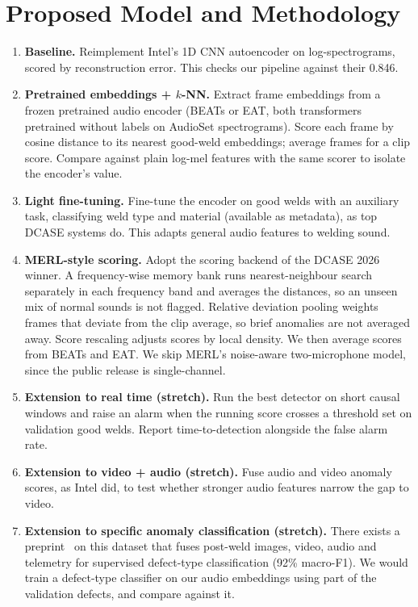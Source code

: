 \documentclass[11pt]{article}
\begin{document}
\section{Proposed Model and Methodology}

\begin{enumerate}
    \item \textbf{Baseline.} Reimplement Intel's 1D CNN autoencoder on log-spectrograms, scored by reconstruction error. This checks our pipeline against their 0.846.
    \item \textbf{Pretrained embeddings + $k$-NN.} Extract frame embeddings from a frozen pretrained audio encoder (BEATs or EAT, both transformers pretrained without labels on AudioSet spectrograms). Score each frame by cosine distance to its nearest good-weld embeddings; average frames for a clip score. Compare against plain log-mel features with the same scorer to isolate the encoder's value.
    \item \textbf{Light fine-tuning.} Fine-tune the encoder on good welds with an auxiliary task, classifying weld type and material (available as metadata), as top DCASE systems do. This adapts general audio features to welding sound.
    \item \textbf{MERL-style scoring.} Adopt the scoring backend of the DCASE 2026 winner. A frequency-wise memory bank runs nearest-neighbour search separately in each frequency band and averages the distances, so an unseen mix of normal sounds is not flagged. Relative deviation pooling weights frames that deviate from the clip average, so brief anomalies are not averaged away. Score rescaling adjusts scores by local density. We then average scores from BEATs and EAT. We skip MERL's noise-aware two-microphone model, since the public release is single-channel.
    \item \textbf{Extension to real time (stretch).} Run the best detector on short causal windows and raise an alarm when the running score crosses a threshold set on validation good welds. Report time-to-detection alongside the false alarm rate.
    \item \textbf{Extension to video + audio (stretch).} Fuse audio and video anomaly scores, as Intel did, to test whether stronger audio features narrow the gap to video.
    \item \textbf{Extension to specific anomaly classification (stretch).} There exists a preprint~\cite{supervisedpreprint} on this dataset that fuses post-weld images, video, audio and telemetry for supervised defect-type classification (92\% macro-F1). We would train a defect-type classifier on our audio embeddings using part of the validation defects, and compare against it.
\end{enumerate}
\end{document}
